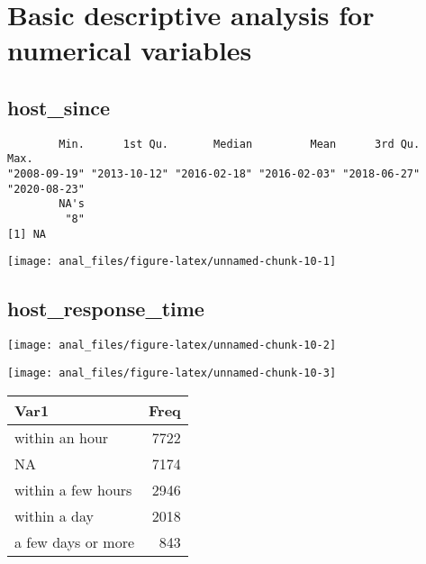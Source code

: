 \pagebreak

\hypertarget{basic-descriptive-analysis-for-numerical-variables}{%
\section{Basic descriptive analysis for numerical
variables}\label{basic-descriptive-analysis-for-numerical-variables}}

\centering

\hypertarget{host_since}{%
\subsection{host\_since}\label{host_since}}

\begin{verbatim}        Min.      1st Qu.       Median         Mean      3rd Qu.         Max. 
"2008-09-19" "2013-10-12" "2016-02-18" "2016-02-03" "2018-06-27" "2020-08-23" 
        NA's 
         "8" 
[1] NA

\end{verbatim}

\begin{center}\texttt{[image: anal\_files/figure-latex/unnamed-chunk-10-1]} \end{center}

\pagebreak

\centering

\hypertarget{host_response_time}{%
\subsection{host\_response\_time}\label{host_response_time}}

\begin{center}\texttt{[image: anal\_files/figure-latex/unnamed-chunk-10-2]} \end{center}

\begin{center}\texttt{[image: anal\_files/figure-latex/unnamed-chunk-10-3]} \end{center}

\begin{table}[H]
\centering
\begin{tabular}[t]{lr}
\toprule
Var1 & Freq\\
\midrule
within an hour & 7722\\
NA & 7174\\
within a few hours & 2946\\
within a day & 2018\\
a few days or more & 843\\
\bottomrule
\end{tabular}
\end{table}
\pagebreak

